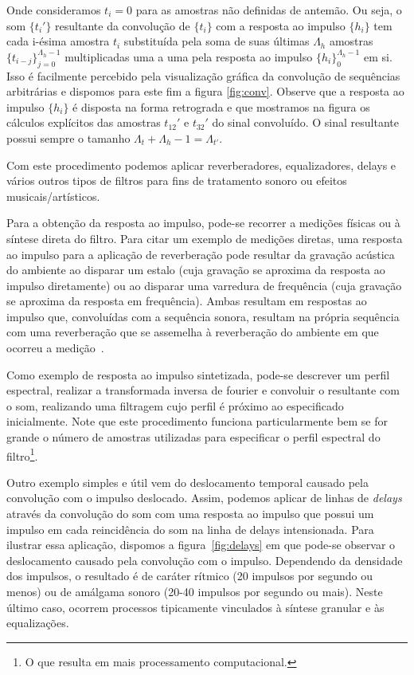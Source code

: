 \begin{itemize}
Onde consideramos $t_i=0$ para as
amostras não definidas de antemão.
Ou seja, o som $\{t_i'\}$ resultante da convolução de $\{t_i\}$ com a resposta ao impulso $\{h_i\}$
tem cada i-ésima amostra $t_i$ substituída pela soma de suas últimas $\Lambda_h$ amostras $\{t_{i-j}\}_{j=0}^{\Lambda_h-1}$
multiplicadas uma a uma pela resposta ao impulso $\{h_i\}_0^{\Lambda_h-1}$ em si. Isso é facilmente
percebido pela visualização gráfica da convolução de sequências arbitrárias e dispomos
para este fim a figura \ref{fig:conv}. Observe que a resposta ao impulso $\{h_i\}$
é disposta na forma retrograda e que mostramos na figura os cálculos explícitos
das amostras $t_{12}'$ e $t_{32}'$ do sinal convoluído. O sinal resultante possui
sempre o tamanho $\Lambda_t+\Lambda_h -1=\Lambda_{t'}$.




Com este procedimento podemos aplicar reverberadores, equalizadores, delays
e vários outros tipos de filtros para fins de tratamento sonoro ou
efeitos musicais/artísticos.
 
Para a obtenção da resposta ao impulso, pode-se recorrer a medições
físicas ou à síntese direta do filtro. Para citar um exemplo
de medições diretas, uma resposta ao impulso para a aplicação
de reverberação pode resultar da gravação acústica do ambiente ao disparar
um estalo (cuja gravação se aproxima da resposta ao impulso diretamente) ou ao disparar uma
varredura de frequência (cuja gravação se aproxima da resposta em frequência).
Ambas resultam em respostas ao impulso
que, convoluídas com a sequência sonora, resultam na própria sequência
com uma reverberação que se assemelha à reverberação do ambiente 
em que ocorreu a medição~\cite{Cook}.

Como exemplo de resposta ao impulso sintetizada, pode-se
descrever um perfil espectral, realizar a transformada inversa
de fourier e convoluir o resultante com o som, realizando
uma filtragem cujo perfil é próximo ao especificado inicialmente. Note que este procedimento funciona particularmente bem se for grande o número de amostras utilizadas para especificar o perfil espectral do filtro\footnote{O que resulta em mais processamento computacional.}.

Outro exemplo simples e útil vem do deslocamento temporal causado pela convolução com o impulso deslocado. Assim, podemos aplicar de linhas de \emph{delays} através
da convolução do som com uma resposta ao impulso que possui um impulso
em cada reincidência do som na linha de delays intensionada.
Para ilustrar essa aplicação, dispomos a figura~\ref{fig:delays}
em que pode-se observar o deslocamento causado pela convolução
com o impulso. Dependendo da densidade dos impulsos, o resultado
é de caráter rítmico (20 impulsos por segundo ou menos) ou de amálgama
sonoro (20-40 impulsos por segundo ou mais). Neste último caso,
ocorrem processos tipicamente vinculados à síntese granular e às
equalizações.


\end{itemize}
